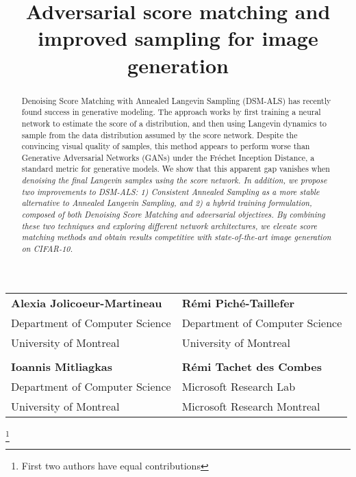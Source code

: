 \documentclass{article} \usepackage{iclr2021_conference_notitle,times}
\title{Adversarial score matching and improved sampling for image generation}
\theoremstyle{definition}
\theoremstyle{definition}
\begin{document}
\maketitle
\renewcommand{\thefootnote}{\fnsymbol{footnote}}



\vspace{-1cm}
\hspace{-1cm}
\setlength{\tabcolsep}{30pt}
\begin{tabular}{ll}
\textbf{Alexia Jolicoeur-Martineau}\textsuperscript{} & \textbf{Rémi Piché-Taillefer}\textsuperscript{} \\
    \normalfont Department of Computer Science & \normalfont Department of Computer Science \\
    \normalfont University of Montreal & \normalfont University of Montreal \\  \vspace{5pt} \\
    \textbf{Ioannis Mitliagkas} & \textbf{Rémi Tachet des Combes} \\ \normalfont Department of Computer Science & \normalfont Microsoft Research Lab \\
    \normalfont University of Montreal & \normalfont Microsoft Research Montreal
\end{tabular}
\vspace{1cm}
\setlength{\tabcolsep}{6pt}
\footnote[0]{ First two authors have equal contributions}
 
\begin{abstract}
Denoising Score Matching with Annealed Langevin Sampling (DSM-ALS) has recently found success in generative modeling. The approach works by first training a neural network to estimate the score of a distribution, and then using Langevin dynamics to sample from the data distribution assumed by the score network. Despite the convincing visual quality of samples, this method appears to perform worse than Generative Adversarial Networks (GANs) under the Fréchet Inception Distance, a standard metric for generative models. We show that this apparent gap vanishes when \em denoising \em the final Langevin samples using the score network.
In addition, we propose two improvements to DSM-ALS:  1) Consistent Annealed Sampling as a more stable alternative to Annealed Langevin Sampling, and 2) a hybrid training formulation, composed of both Denoising Score Matching and adversarial objectives. By combining these two techniques and exploring different network architectures, we elevate score matching methods and obtain results competitive with state-of-the-art image generation on CIFAR-10.

  
\end{abstract}
\end{document}
